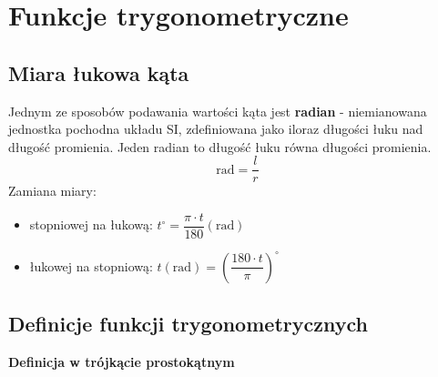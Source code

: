 \documentclass[14pt,a4paper]{extarticle}
\begin{document}
\newpage

\section{Funkcje trygonometryczne}
\subsection{Miara łukowa kąta}
\noindent Jednym ze sposobów podawania wartości kąta jest \textbf{radian} - niemianowana jednostka
pochodna układu SI, zdefiniowana jako iloraz długości łuku nad długość promienia. Jeden radian to
długość łuku równa długości promienia.\\
$$\text{rad} = \dfrac{l}{r}$$\hfill\break
Zamiana miary:
\begin{itemize}
   \item stopniowej na łukową: $t^{\circ } = \dfrac{\pi \cdot t}{180} (\text{rad})$
   \item łukowej na stopniową: $t(\text{rad}) = \left(\dfrac{180 \cdot t}{\pi}\right)^{\circ}$
\end{itemize}
\subsection{Definicje funkcji trygonometrycznych}
\noindent\textbf{Definicja w trójkącie prostokątnym}
\end{document}
